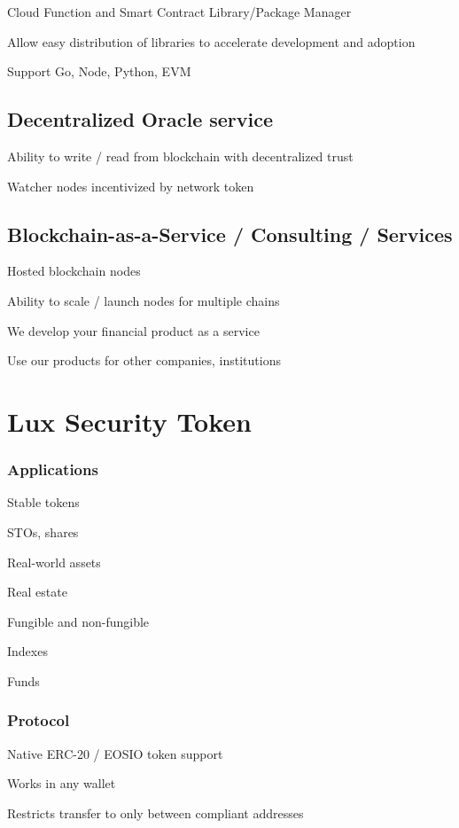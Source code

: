 \documentclass[11pt]{article}
\begin{document}
Cloud Function and Smart Contract Library/Package Manager


Allow easy distribution of libraries to accelerate development and adoption


Support Go, Node, Python, EVM


\subsection{Decentralized Oracle service}

Ability to write / read from blockchain with decentralized trust


Watcher nodes incentivized by network token


\subsection{Blockchain-as-a-Service / Consulting / Services}

Hosted blockchain nodes


Ability to scale / launch nodes for multiple chains


We develop your financial product as a service


Use our products for other companies, institutions


\section{Lux Security Token}

\subsubsection{Applications}

Stable tokens


STOs, shares


Real-world assets


Real estate


Fungible and non-fungible


Indexes


Funds


\subsubsection{Protocol}

Native ERC-20 / EOSIO token support


Works in any wallet


Restricts transfer to only between compliant addresses
\end{document}
